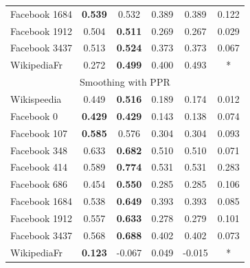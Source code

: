 \begin{table}[t]
\begin{center}
\begin{tabular}{l|c|c|c|c|c}
Facebook 1684 & \textbf{0.539} & 0.532 & 0.389 & 0.389 & 0.122\\
Facebook 1912 & 0.504 & \textbf{0.511} & 0.269 & 0.267 & 0.029\\
Facebook 3437 & 0.513 & \textbf{0.524} & 0.373 & 0.373 & 0.067\\
WikipediaFr  &  0.272 & \textbf{0.499} & 0.400 & 0.493 & *\\
\hline
\multicolumn{6}{c}{Smoothing with PPR}\\
\hline
Wikispeedia  &  0.449 & \textbf{0.516} & 0.189 & 0.174 & 0.012\\
Facebook 0 & \textbf{0.429} & \textbf{0.429} & 0.143 & 0.138 & 0.074 \\
Facebook 107 & \textbf{0.585} & 0.576 & 0.304 & 0.304 & 0.093 \\
Facebook 348 & 0.633 & \textbf{0.682} & 0.510 & 0.510 & 0.071\\
Facebook 414 & 0.589 & \textbf{0.774} & 0.531 & 0.531 & 0.283\\
Facebook 686 & 0.454 & \textbf{0.550} & 0.285 & 0.285 & 0.106\\
Facebook 1684 & 0.538 & \textbf{0.649} & 0.393 & 0.393 & 0.085 \\
Facebook 1912 & 0.557 & \textbf{0.633} & 0.278 & 0.279 & 0.101\\
Facebook 3437 & 0.568 & \textbf{0.688} & 0.402 & 0.402 & 0.073\\
WikipediaFr  &  \textbf{0.123} & -0.067 & 0.049 & -0.015 & *\\
\hline
        \end{tabular}
    \end{center}
    \label{tab:CISIP_scores}
\end{table}

